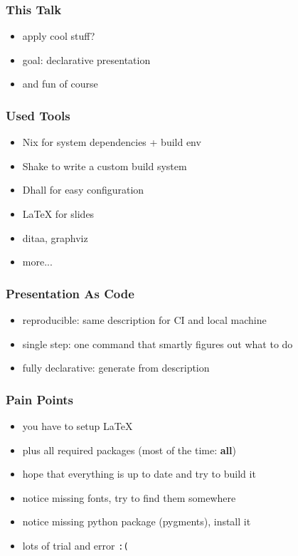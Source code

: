 \documentclass{beamer}
\begin{document}
\begin{frame}
  \frametitle{This Talk}
  \begin{itemize}
  \item apply cool stuff?
  \item goal: declarative presentation
  \item and fun of course
  \end{itemize}
\end{frame}

\begin{frame}
  \frametitle{Used Tools}
  \begin{itemize}
  \item Nix for system dependencies + build env
  \item Shake to write a custom build system
  \item Dhall for easy configuration
  \item LaTeX for slides
  \item ditaa, graphviz
  \item more...
  \end{itemize}
\end{frame}

\begin{frame}
  \frametitle{Presentation As Code}
  \begin{itemize}
  \item reproducible: same description for CI and local machine
  \item single step: one command that smartly figures out what to do
  \item fully declarative: generate from description
  \end{itemize}
\end{frame}

\begin{frame}
  \frametitle{Pain Points}
  \begin{itemize}
  \item you have to setup LaTeX
  \item plus all required packages (most of the time: \textbf{all})
  \item hope that everything is up to date and try to build it
  \item notice missing fonts, try to find them somewhere
  \item notice missing python package (pygments), install it
  \item lots of trial and error \texttt{:(}
  \end{itemize}
\end{frame}
\end{document}
